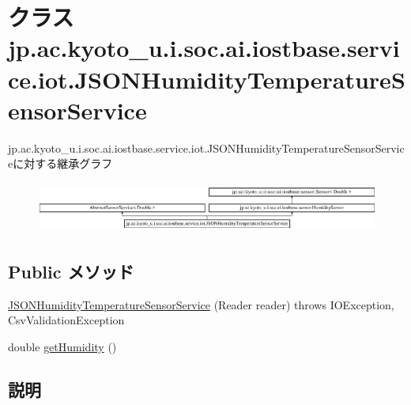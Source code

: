 \hypertarget{classjp_1_1ac_1_1kyoto__u_1_1i_1_1soc_1_1ai_1_1iostbase_1_1service_1_1iot_1_1_j_s_o_n_humidity_temperature_sensor_service}{\section{クラス jp.\-ac.\-kyoto\-\_\-u.\-i.\-soc.\-ai.\-iostbase.\-service.\-iot.\-J\-S\-O\-N\-Humidity\-Temperature\-Sensor\-Service}
\label{classjp_1_1ac_1_1kyoto__u_1_1i_1_1soc_1_1ai_1_1iostbase_1_1service_1_1iot_1_1_j_s_o_n_humidity_temperature_sensor_service}
}
jp.\-ac.\-kyoto\-\_\-u.\-i.\-soc.\-ai.\-iostbase.\-service.\-iot.\-J\-S\-O\-N\-Humidity\-Temperature\-Sensor\-Serviceに対する継承グラフ\begin{figure}[H]
\begin{center}
\leavevmode
\includegraphics[height=1.696970cm]{classjp_1_1ac_1_1kyoto__u_1_1i_1_1soc_1_1ai_1_1iostbase_1_1service_1_1iot_1_1_j_s_o_n_humidity_temperature_sensor_service}
\end{center}
\end{figure}
\subsection*{Public メソッド}
\begin{DoxyCompactItemize}
\item 
\hyperlink{classjp_1_1ac_1_1kyoto__u_1_1i_1_1soc_1_1ai_1_1iostbase_1_1service_1_1iot_1_1_j_s_o_n_humidity_temperature_sensor_service_a3ea978542794c3bb020bf64ba872573a}{J\-S\-O\-N\-Humidity\-Temperature\-Sensor\-Service} (Reader reader)  throws I\-O\-Exception, Csv\-Validation\-Exception 
\item 
double \hyperlink{classjp_1_1ac_1_1kyoto__u_1_1i_1_1soc_1_1ai_1_1iostbase_1_1service_1_1iot_1_1_j_s_o_n_humidity_temperature_sensor_service_a65979beae63fe5ddaed6d340e82bfd0f}{get\-Humidity} ()
\end{DoxyCompactItemize}


\subsection{説明}


